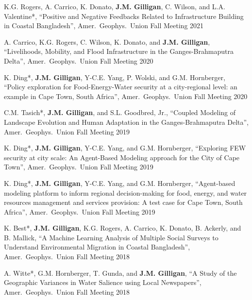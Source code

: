 %
%
    \item K.G. Rogers, A. Carrico, K. Donato, \textbf{J.M. Gilligan},
    C. Wilson, and L.A. Valentine*,
    \enquote{Positive and Negative Feedbacks Related to Infrastructure
    Building in Coastal Bangladesh},
    Amer.\ Geophys.\ Union Fall Meeting 2021

    \item A. Carrico, K.G. Rogers, C. Wilson, K. Donato, and \textbf{J.M. Gilligan},
    \enquote{Livelihoods, Mobility, and Flood Infrastructure in the
    Ganges-Brahmaputra Delta},
    Amer.\ Geophys.\ Union Fall Meeting 2020

    \item K. Ding*, \textbf{J.M. Gilligan}, Y-C.E. Yang, P. Wolski, and G.M. Hornberger,
    \enquote{Policy exploration for Food-Energy-Water security at a city-regional level: an example in Cape Town, South Africa},
    Amer.\ Geophys.\ Union Fall Meeting 2020

    \item C.M. Tasich*, \textbf{J.M. Gilligan}, and S.L. Goodbred, Jr.,
    \enquote{Coupled Modeling of Landscape Evolution and Human Adaptation in the Ganges-Brahmaputra Delta},
    Amer.\ Geophys.\ Union Fall Meeting 2019

    \item K. Ding*, \textbf{J.M. Gilligan}, Y-C.E. Yang, and G.M. Hornberger,
    \enquote{Exploring FEW security at city scale: An Agent-Based Modeling approach for the City of Cape Town},
    Amer.\ Geophys.\ Union Fall Meeting 2019

    \item K. Ding*, \textbf{J.M. Gilligan}, Y-C.E. Yang, and G.M. Hornberger,
    \enquote{Agent-based modeling platform to inform regional decision-making for food, energy, and water resources management and services provision: A test case for Cape Town, South Africa},
    Amer.\ Geophys.\ Union Fall Meeting 2019

    \item
    K. Best*, \textbf{J.M. Gilligan}, K.G. Rogers, A. Carrico, K. Donato, B. Ackerly, and B. Mallick,
    \enquote{A Machine Learning Analysis of Multiple Social Surveys to Understand Environmental Migration in Coastal Bangladesh},
    Amer.\ Geophys.\ Union Fall Meeting 2018

    \item
    A. Witte*, G.M. Hornberger, T. Gunda, and \textbf{J.M. Gilligan},
    \enquote{A Study of the Geographic Variances in Water Salience using Local Newspapers},
    Amer.\ Geophys.\ Union Fall Meeting 2018

